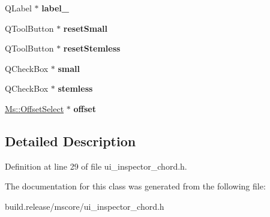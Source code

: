 \begin{DoxyCompactItemize}
Q\+Label $\ast$ {\bfseries label\+\_}
\item 
\mbox{\label{class_ui___inspector_chord_a3dc06a883fa1f44f40b7134bc1809c7e}} 
Q\+Tool\+Button $\ast$ {\bfseries reset\+Small}
\item 
\mbox{\label{class_ui___inspector_chord_ae0acffe5f2e90cd058456b2ac4f2211c}} 
Q\+Tool\+Button $\ast$ {\bfseries reset\+Stemless}
\item 
\mbox{\label{class_ui___inspector_chord_a5376e92da9093b2ca169451c3d873d0b}} 
Q\+Check\+Box $\ast$ {\bfseries small}
\item 
\mbox{\label{class_ui___inspector_chord_a69f586e89c0b6b7e936653f5a1e5f1bc}} 
Q\+Check\+Box $\ast$ {\bfseries stemless}
\item 
\mbox{\label{class_ui___inspector_chord_a4c97c0f9994fb4f1d9616c43c6550d26}} 
\hyperlink{class_ms_1_1_offset_select}{Ms\+::\+Offset\+Select} $\ast$ {\bfseries offset}
\end{DoxyCompactItemize}


\subsection{Detailed Description}


Definition at line 29 of file ui\+\_\+inspector\+\_\+chord.\+h.



The documentation for this class was generated from the following file\+:\begin{DoxyCompactItemize}
\item 
build.\+release/mscore/ui\+\_\+inspector\+\_\+chord.\+h\end{DoxyCompactItemize}

